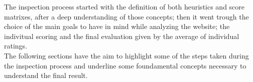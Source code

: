 The inspection process started with the definition of both heuristics and score matrixes, after a deep understanding of those concepts; then it went trough the choice of the main goals to have in mind while analyzing the website; the indivitual scoring and the final evaluation given by the average of individual ratings.\\
The following sections have the aim to highlight some of the steps taken during the inspection process and underline some foundamental concepts necessary to understand the final result.